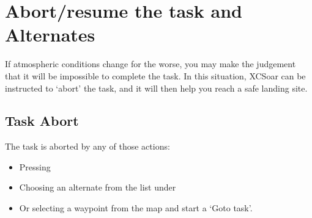 






\section{Abort/resume the task and Alternates}

If atmospheric conditions change for the worse, you may make the
judgement that it will be impossible to complete the task.  In this
situation, XCSoar can be instructed to `abort' the task, and it will
then help you reach a safe landing site.

\subsection*{Task Abort}\label{sec:taskabort}
The task is aborted by any of those actions:
\begin{itemize}
\item Pressing \blink{}
\item Choosing an alternate from the list under  
 \blink{}
\item Or selecting a waypoint from the map and start a `Goto task'.
\end{itemize}


